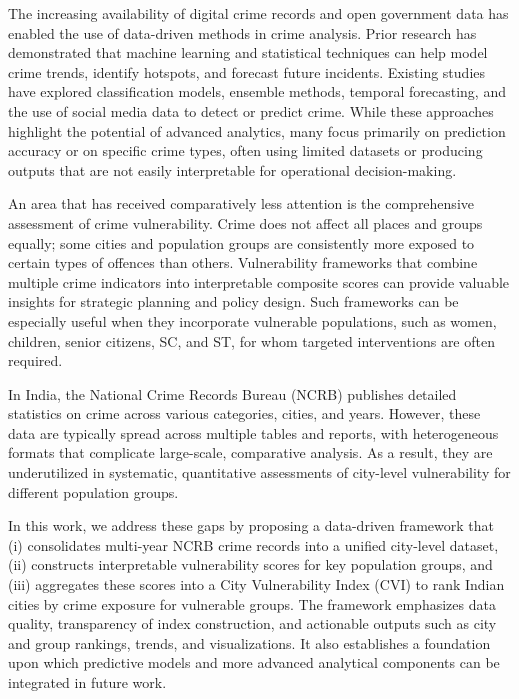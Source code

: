 \documentclass[conference]{IEEEtran}
\begin{document}
The increasing availability of digital crime records and open government data has enabled the use of data-driven methods in crime analysis. Prior research has demonstrated that machine learning and statistical techniques can help model crime trends, identify hotspots, and forecast future incidents. Existing studies have explored classification models, ensemble methods, temporal forecasting, and the use of social media data to detect or predict crime. While these approaches highlight the potential of advanced analytics, many focus primarily on prediction accuracy or on specific crime types, often using limited datasets or producing outputs that are not easily interpretable for operational decision-making.

An area that has received comparatively less attention is the comprehensive assessment of crime vulnerability. Crime does not affect all places and groups equally; some cities and population groups are consistently more exposed to certain types of offences than others. Vulnerability frameworks that combine multiple crime indicators into interpretable composite scores can provide valuable insights for strategic planning and policy design. Such frameworks can be especially useful when they incorporate vulnerable populations, such as women, children, senior citizens, SC, and ST, for whom targeted interventions are often required.

In India, the National Crime Records Bureau (NCRB) publishes detailed statistics on crime across various categories, cities, and years. However, these data are typically spread across multiple tables and reports, with heterogeneous formats that complicate large-scale, comparative analysis. As a result, they are underutilized in systematic, quantitative assessments of city-level vulnerability for different population groups.

In this work, we address these gaps by proposing a data-driven framework that (i) consolidates multi-year NCRB crime records into a unified city-level dataset, (ii) constructs interpretable vulnerability scores for key population groups, and (iii) aggregates these scores into a City Vulnerability Index (CVI) to rank Indian cities by crime exposure for vulnerable groups. The framework emphasizes data quality, transparency of index construction, and actionable outputs such as city and group rankings, trends, and visualizations. It also establishes a foundation upon which predictive models and more advanced analytical components can be integrated in future work.
\end{document}

